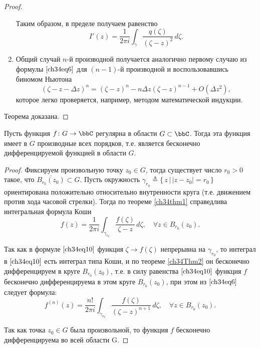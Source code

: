 \begin{proof}
\begin{enumerate}[wide, labelwidth=!, labelindent=\parindent]
Таким образом, в пределе получаем равенство
\begin{equation} \label{ch34eq9}
I'(z) = \frac{1}{2\pi i} \int_\gamma \frac{q(\zeta)}{(\zeta - z)^2} \,d\zeta.
\end{equation}

\item
Общий случай $n$-й производной получается аналогично первому случаю из формулы $\eqref{ch34eq6}$ для $(n - 1)$-й производной и воспользовавшись биномом Ньютона
$$
(\zeta - z - \Delta z)^n = (\zeta - z)^n - n \Delta z (\zeta - z)^{n - 1} + O(\Delta z^2),
$$
которое легко проверяется, например, методом математической индукции.
\end{enumerate}

Теорема доказана.
\end{proof}
\begin{thm} \label{ch34Thm3}
Пусть функция $f \colon G \to \bbC$ регулярна в области $G \subset \bbC$. Тогда эта функция имеет в $G$ производные всех порядков, т.е. является бесконечно дифференцируемой функцией в области $G$.
\end{thm}

\begin{proof}
Фиксируем произвольную точку $z_0 \in G$, тогда существует число $r_0 > 0$ такое, что $\overline{B_{r_0}(z_0)}\subset G$. Пусть окружность $\gamma_{r_0} \triangleq \{\, z \,\big|\, |z - z_0| = r_0 \,\}$ ориентирована положительно относительно внутренности круга (т.е. движением против хода часовой стрелки). Тогда по теореме \ref{ch34thm1} справедлива интегральная формула Коши
\begin{equation} \label{ch34eq10}
f(z) = \frac{1}{2\pi i} \int_{\gamma_{r_0}} \frac{f(\zeta)}{\zeta - z} \,d\zeta, \quad \forall z \in B_{r_0}(z_0).
\end{equation}

Так как в формуле $\eqref{ch34eq10}$ функция $\zeta \to f(\zeta)$ непрерывна на $\gamma_{r_0}$, то интеграл в $\eqref{ch34eq10}$ есть интеграл типа Коши, и по теореме \ref{ch34Thm2} он бесконечно дифференцируем в круге $B_{r_0}(z_0)$, т.е. в силу равенства $\eqref{ch34eq10}$ функция $f$ бесконечно дифференцируема в этом круге $B_{r_0}(z_0)$, при этом из $\eqref{ch34eq6}$ следует формула:
\begin{equation} \label{ch34eq11}
f^{(n)}(z) = \frac{n!}{2\pi i} \int_{\gamma_{r_0}} \frac{f(\zeta)}{(\zeta - z)^{n+1}}\,d\zeta, \quad \forall z \in B_{r_0}(z_0).
\end{equation}

Так как точка $z_0 \in G$ была произвольной, то функция $f$ бесконечно дифференцируема во всей области G.
\end{proof}

